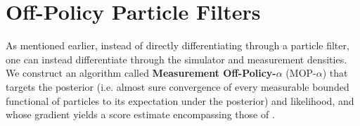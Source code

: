 \documentclass[9pt,twocolumn,twoside]{pnas-new}
\begin{document}


\section{Off-Policy Particle Filters}

As mentioned earlier, instead of directly differentiating through a particle filter, one can instead differentiate through the simulator and measurement densities. We construct an algorithm called \textbf{Measurement Off-Policy-$\alpha$} (MOP-$\alpha$) that targets the posterior (i.e. almost sure convergence of every measurable bounded functional of particles to its expectation under the posterior) and likelihood, and whose gradient yields a score estimate encompassing those of \cite{poyiadjis11, scibior21,naesseth18}.
\end{document}
